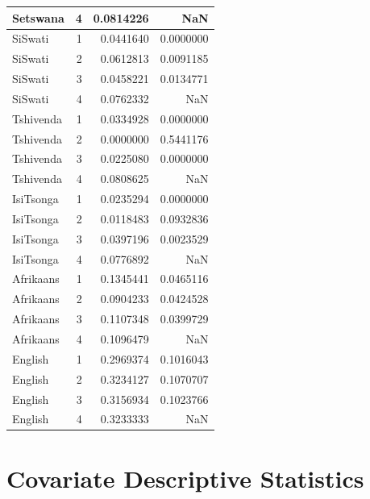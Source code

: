 \documentclass[a4paper,british]{article}\usepackage[]{graphicx}\usepackage[]{color}
\newenvironment{knitrout}{}{} %
\begin{document}
\begin{table}[H]
\begin{knitrout}
\begin{tabular}{l|r|r|r}
\hline
Setswana & 4 & 0.0814226 & NaN\\
\hline
SiSwati & 1 & 0.0441640 & 0.0000000\\
\hline
SiSwati & 2 & 0.0612813 & 0.0091185\\
\hline
SiSwati & 3 & 0.0458221 & 0.0134771\\
\hline
SiSwati & 4 & 0.0762332 & NaN\\
\hline
Tshivenda & 1 & 0.0334928 & 0.0000000\\
\hline
Tshivenda & 2 & 0.0000000 & 0.5441176\\
\hline
Tshivenda & 3 & 0.0225080 & 0.0000000\\
\hline
Tshivenda & 4 & 0.0808625 & NaN\\
\hline
IsiTsonga & 1 & 0.0235294 & 0.0000000\\
\hline
IsiTsonga & 2 & 0.0118483 & 0.0932836\\
\hline
IsiTsonga & 3 & 0.0397196 & 0.0023529\\
\hline
IsiTsonga & 4 & 0.0776892 & NaN\\
\hline
Afrikaans & 1 & 0.1345441 & 0.0465116\\
\hline
Afrikaans & 2 & 0.0904233 & 0.0424528\\
\hline
Afrikaans & 3 & 0.1107348 & 0.0399729\\
\hline
Afrikaans & 4 & 0.1096479 & NaN\\
\hline
English & 1 & 0.2969374 & 0.1016043\\
\hline
English & 2 & 0.3234127 & 0.1070707\\
\hline
English & 3 & 0.3156934 & 0.1023766\\
\hline
English & 4 & 0.3233333 & NaN\\
\hline
\end{tabular}
\end{knitrout}
\end{table}


\section{Covariate Descriptive Statistics}
\end{document}
